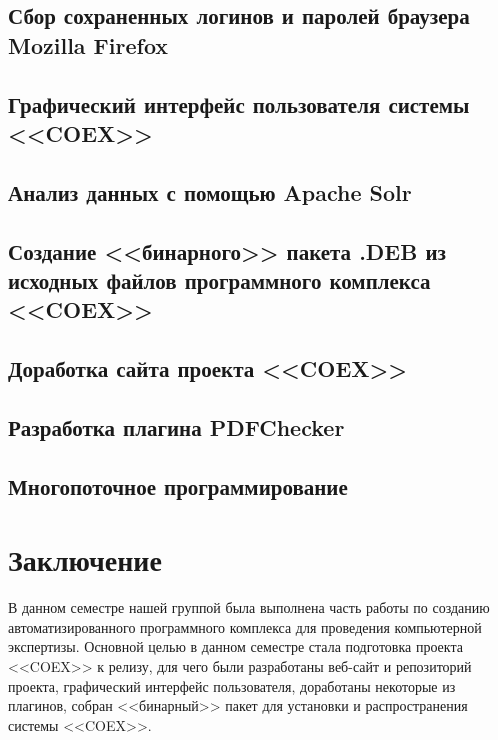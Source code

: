 \subsection{Сбор сохраненных логинов и паролей браузера Mozilla Firefox}



\newpage
\subsection{Графический интерфейс пользователя системы <<COEX>>}

\newpage
\subsection{Анализ данных с помощью Apache Solr}

 
\newpage
\subsection {Создание <<бинарного>> пакета .DEB из исходных файлов программного комплекса <<COEX>>} 


\newpage 
\subsection{Доработка сайта проекта <<COEX>>}

\newpage
\subsection{Разработка плагина PDFChecker}


\newpage


\newpage
\subsection{Многопоточное программирование} 



\newpage
\section*{Заключение}
В данном семестре нашей группой была выполнена часть работы по созданию автоматизированного программного комплекса для проведения компьютерной экспертизы. Основной целью в данном семестре стала подготовка проекта <<COEX>> к релизу, для чего были разработаны веб-сайт и репозиторий проекта, графический интерфейс пользователя, доработаны некоторые из плагинов, собран <<бинарный>> пакет для установки и распространения системы <<COEX>>. 

